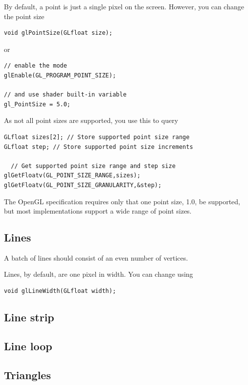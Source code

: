 By default, a point is just a single pixel on the screen. However, you
can change the point size
\begin{verbatim}
void glPointSize(GLfloat size);
\end{verbatim}
or
\begin{verbatim}
// enable the mode
glEnable(GL_PROGRAM_POINT_SIZE);

// and use shader built-in variable
gl_PointSize = 5.0; 
\end{verbatim}

As not all point sizes are supported, you use this to query
\begin{verbatim}
GLfloat sizes[2]; // Store supported point size range
GLfloat step; // Store supported point size increments

  // Get supported point size range and step size
glGetFloatv(GL_POINT_SIZE_RANGE,sizes);
glGetFloatv(GL_POINT_SIZE_GRANULARITY,&step);
\end{verbatim}

\begin{framed}
  The OpenGL specification requires only that one point size, 1.0, be
  supported, but most implementations support a wide range of point
  sizes.
\end{framed}

\subsection{Lines}
\label{sec:lines}

A batch of lines should consist of an even number of vertices.

Lines, by default, are one pixel in width. You can change using
\begin{verbatim}
void glLineWidth(GLfloat width);
\end{verbatim}

\subsection{Line strip}
\label{sec:line-strip}

\subsection{Line loop}
\label{sec:line-loop}

\subsection{Triangles}
\label{sec:triangles}

